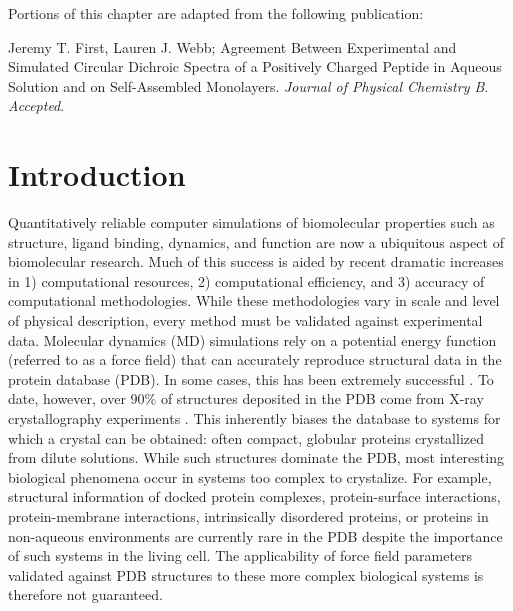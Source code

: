 Portions of this chapter are adapted from the following publication: 

\noindent Jeremy T. First, Lauren J. Webb; Agreement Between Experimental and Simulated Circular Dichroic Spectra of a Positively Charged Peptide in Aqueous Solution and on Self-Assembled Monolayers. \emph{Journal of Physical Chemistry B}. \emph{Accepted}.

\section{Introduction}

Quantitatively reliable computer simulations of biomolecular properties such as structure, ligand binding, dynamics, and function are now a ubiquitous aspect of biomolecular research. 
Much of this success is aided by recent dramatic increases in 1) computational resources, 2) computational efficiency, and 3) accuracy of computational methodologies. 
While these methodologies vary in scale and level of physical description, every method must be validated against experimental data. 
Molecular dynamics (MD) simulations rely on a potential energy function (referred to as a force field) that can accurately reproduce structural data in the protein database (PDB). 
In some cases, this has been extremely successful \cite{Duan1998, Lindorff-Larsen2011, Bowman2011, Voelz2012, Shaw2010, Lane2013, Koukos2014a}.
To date, however, over 90\% of structures deposited in the PDB come from X-ray crystallography experiments \cite{Berman2000}. 
This inherently biases the database to systems for which a crystal can be obtained: often compact, globular proteins crystallized from dilute solutions. 
While such structures dominate the PDB, most interesting biological phenomena occur in systems too complex to crystalize. 
For example, structural information of docked protein complexes, protein-surface interactions, protein-membrane interactions, intrinsically disordered proteins, or proteins in non-aqueous environments are currently rare in the PDB\cite{Berman2013} despite the importance of such systems in the living cell. 
The applicability of force field parameters validated against PDB structures to these more complex biological systems is therefore not guaranteed.

